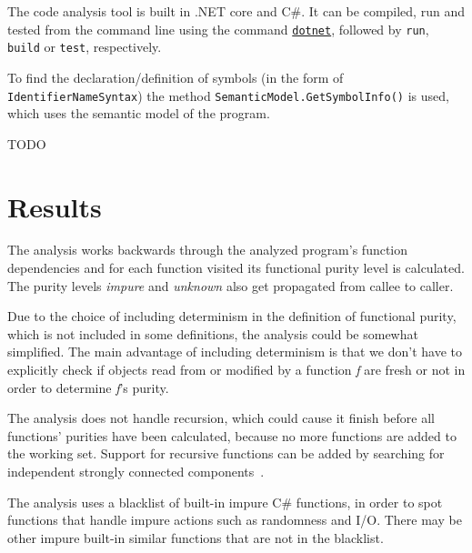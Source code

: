 \documentclass[a4paper,12pt]{article}
\begin{document}
The code analysis tool is built in .NET core and C\#. It can be compiled, run and tested from the command line using the command \href{https://docs.microsoft.com/en-us/dotnet/core/tools/}{\texttt{dotnet}}, followed by \texttt{run}, \texttt{build} or \texttt{test}, respectively.

To find the declaration/definition of symbols (in the form of \texttt{IdentifierNameSyn\allowbreak tax}) the method \texttt{SemanticModel.GetSym\allowbreak bolInfo()} is used, which uses the semantic model of the program.


TODO

\section{Results} \label{sec:Results}
The analysis works backwards through the analyzed program's function dependencies and for each function visited its functional purity level is calculated. The purity levels \textit{impure} and \textit{unknown} also get propagated from callee to caller.

Due to the choice of including determinism in the definition of functional purity, which is not included in some definitions, the analysis could be somewhat simplified. The main advantage of including determinism is that we don't have to explicitly check if objects read from or modified by a function \textit{f} are fresh or not in order to determine \textit{f}'s purity.


The analysis does not handle recursion, which could cause it finish before all functions' purities have been calculated, because no more functions are added to the working set. Support for recursive functions can be added by searching for independent strongly connected components~\cite{pitidis2010purity}.


The analysis uses a blacklist of built-in impure C\# functions, in order to spot functions that handle impure actions such as randomness and I/O. There may be other impure built-in similar functions that are not in the blacklist.
\end{document}
